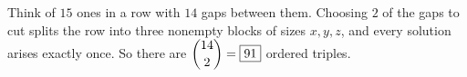 Think of $15$ ones in a row with $14$ gaps between them. Choosing $2$ of the gaps to cut splits the row into three nonempty blocks of sizes $x,y,z$, and every solution arises exactly once. So there are $\dbinom{14}{2}=\boxed{91}$ ordered triples.
